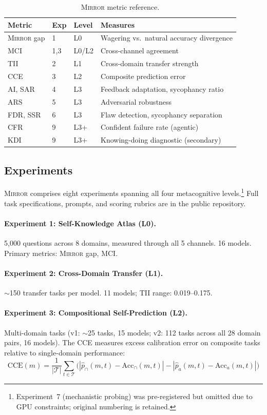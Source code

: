 \documentclass[10pt]{article}
\newcommand{\mirror}{\textsc{Mirror}}
\newcommand{\MCI}{MCI}
\newcommand{\CCE}{CCE}
\newcommand{\ARS}{ARS}
\newcommand{\KDI}{KDI}
\newcommand{\CFR}{CFR}
\newcommand{\SSR}{SSR}
\newcommand{\FDR}{FDR}
\newcommand{\TII}{TII}
\newcommand{\SAR}{SAR}
\newcommand{\AI}{AI}
\begin{document}
\begin{table}[h]
\centering
\caption{\mirror{} metric reference.}
\label{tab:metrics-main}
\small
\begin{tabular}{llll}
\toprule
Metric & Exp & Level & Measures \\
\midrule
\mirror{} gap & 1 & L0 & Wagering vs.\ natural accuracy divergence \\
\MCI{} & 1,3 & L0/L2 & Cross-channel agreement \\
\TII{} & 2 & L1 & Cross-domain transfer strength \\
\CCE{} & 3 & L2 & Composite prediction error \\
\AI{}, \SAR{} & 4 & L3 & Feedback adaptation, sycophancy ratio \\
\ARS{} & 5 & L3 & Adversarial robustness \\
\FDR{}, \SSR{} & 6 & L3 & Flaw detection, sycophancy separation \\
\CFR{} & 9 & L3+ & Confident failure rate (agentic) \\
\KDI{} & 9 & L3+ & Knowing-doing diagnostic (secondary) \\
\bottomrule
\end{tabular}
\end{table}

\subsection{Experiments}

\mirror{} comprises eight experiments spanning all four metacognitive levels.\footnote{Experiment~7 (mechanistic probing) was pre-registered but omitted due to GPU constraints; original numbering is retained.} Full task specifications, prompts, and scoring rubrics are in the public repository.

\paragraph{Experiment 1: Self-Knowledge Atlas (L0).}
5,000 questions across 8 domains, measured through all 5 channels. 16 models. Primary metrics: \mirror{} gap, \MCI{}.

\paragraph{Experiment 2: Cross-Domain Transfer (L1).}
${\sim}$150 transfer tasks per model. 11 models; \TII{} range: 0.019--0.175.

\paragraph{Experiment 3: Compositional Self-Prediction (L2).}
Multi-domain tasks (v1: ${\sim}$25 tasks, 15 models; v2: 112 tasks across all 28 domain pairs, 16 models). The \CCE{} measures excess calibration error on composite tasks relative to single-domain performance:
\begin{equation}
\text{CCE}(m) = \frac{1}{|\mathcal{T}|} \sum_{t \in \mathcal{T}} \bigl(|\hat{p}_{\cap}(m,t) - \text{Acc}_{\cap}(m,t)| - |\hat{p}_{a}(m,t) - \text{Acc}_{a}(m,t)|\bigr)
\label{eq:cce-main}
\end{equation}
\end{document}
